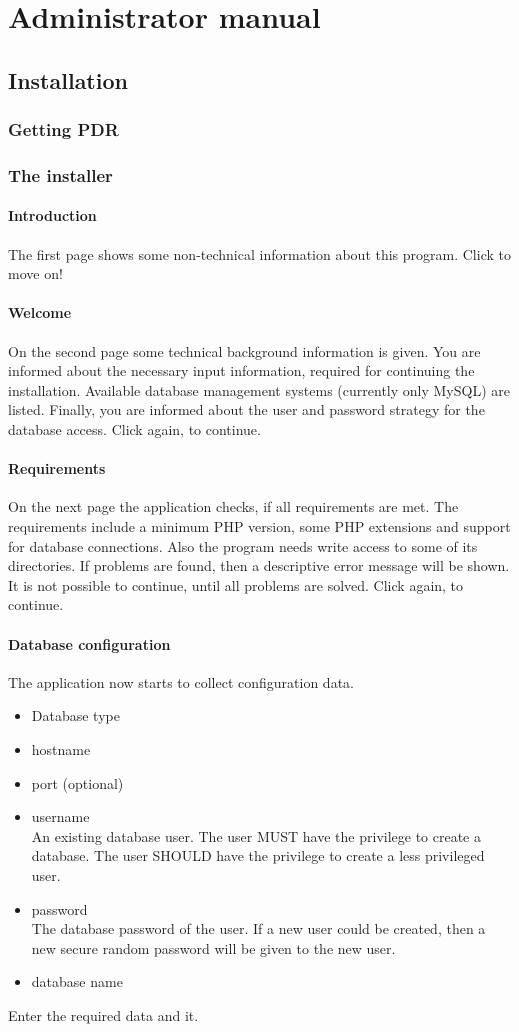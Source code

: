 \chapter{Administrator manual}
\section{Installation}\label{sec:installation}
\subsection{Getting PDR}
\subsection{The installer}
\subsubsection{Introduction}
The first page shows some non-technical information about this program. Click  to move on!
\subsubsection{Welcome}
On the second page some technical background information is given. You are informed about the necessary input information, required for continuing the installation. Available database management systems (currently only MySQL) are listed. Finally, you are informed about the user and password strategy for the database access. Click  again, to continue.
\subsubsection{Requirements}
On the next page the application checks, if all requirements are met. The requirements include a minimum PHP version, some PHP extensions and support for database connections. Also the program needs write access to some of its directories.
If problems are found, then a descriptive error message will be shown. It is not possible to continue, until all problems are solved.
Click  again, to continue.
\subsubsection{Database configuration}
The application now starts to collect configuration data.
\begin{itemize}
\item Database type
\item hostname
\item port (optional)
\item username \\An existing database user. The user MUST have the privilege to create a database. The user SHOULD have the privilege to create a less privileged user.
\item password \\The database password of the user. If a new user could be created, then a new secure random password will be given to the new user.
\item database name
\end{itemize}
Enter the required data and  it.
